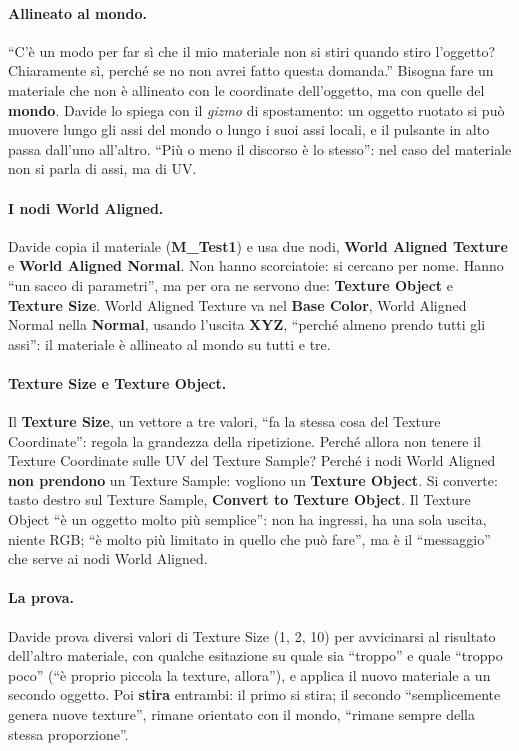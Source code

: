 \paragraph{Allineato al mondo.} ``C'è un modo per far sì che il mio materiale non si
stiri quando stiro l'oggetto? Chiaramente sì, perché se no non avrei fatto questa
domanda.'' Bisogna fare un materiale che non è allineato con le coordinate
dell'oggetto, ma con quelle del \textbf{mondo}. Davide lo spiega con il \emph{gizmo}
di spostamento: un oggetto ruotato si può muovere lungo gli assi del mondo o lungo i
suoi assi locali, e il pulsante in alto passa dall'uno all'altro. ``Più o meno il
discorso è lo stesso'': nel caso del materiale non si parla di assi, ma di UV.

\paragraph{I nodi World Aligned.} Davide copia il materiale (\textbf{M\_Test1}) e usa
due nodi, \textbf{World Aligned Texture} e \textbf{World Aligned Normal}. Non hanno
scorciatoie: si cercano per nome. Hanno ``un sacco di parametri'', ma per ora ne servono
due: \textbf{Texture Object} e \textbf{Texture Size}. World Aligned Texture va nel
\textbf{Base Color}, World Aligned Normal nella \textbf{Normal}, usando l'uscita
\textbf{XYZ}, ``perché almeno prendo tutti gli assi'': il materiale è allineato al
mondo su tutti e tre.

\paragraph{Texture Size e Texture Object.} Il \textbf{Texture Size}, un vettore a tre
valori, ``fa la stessa cosa del Texture Coordinate'': regola la grandezza della
ripetizione. Perché allora non tenere il Texture Coordinate sulle UV del Texture
Sample? Perché i nodi World Aligned \textbf{non prendono} un Texture Sample: vogliono un
\textbf{Texture Object}. Si converte: tasto destro sul Texture Sample, \textbf{Convert to
Texture Object}. Il Texture Object ``è un oggetto molto più semplice'': non ha
ingressi, ha una sola uscita, niente RGB; ``è molto più limitato in quello che può
fare'', ma è il ``messaggio'' che serve ai nodi World Aligned.

\paragraph{La prova.} Davide prova diversi valori di Texture Size (1, 2, 10) per avvicinarsi
al risultato dell'altro materiale, con qualche esitazione su quale sia ``troppo'' e quale
``troppo poco'' (``è proprio piccola la texture, allora''), e applica il nuovo
materiale a un secondo oggetto. Poi \textbf{stira} entrambi: il primo si stira; il
secondo ``semplicemente genera nuove texture'', rimane orientato con il mondo,
``rimane sempre della stessa proporzione''.

